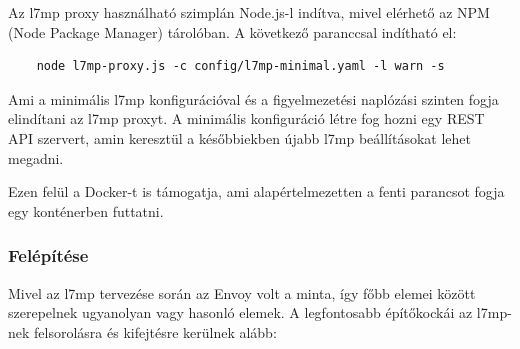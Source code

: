 Az l7mp proxy használható szimplán Node.js-l indítva, mivel elérhető az NPM (Node 
Package Manager) tárolóban. A következő paranccsal indítható el: 

\begin{lstlisting}
	node l7mp-proxy.js -c config/l7mp-minimal.yaml -l warn -s
\end{lstlisting}

Ami a minimális l7mp konfigurációval és a figyelmezetési naplózási szinten fogja
elindítani az l7mp proxyt. A minimális konfiguráció létre fog hozni egy REST API
szervert, amin keresztül a későbbiekben újabb l7mp beállításokat lehet megadni.

Ezen felül a Docker-t is támogatja, ami alapértelmezetten a fenti parancsot fogja
egy konténerben futtatni.

\subsubsection{Felépítése}

Mivel az l7mp tervezése során az Envoy volt a minta, így főbb elemei között szerepelnek
ugyanolyan vagy hasonló elemek. A legfontosabb építőkockái az l7mp-nek 
felsorolásra és kifejtésre kerülnek alább: 

